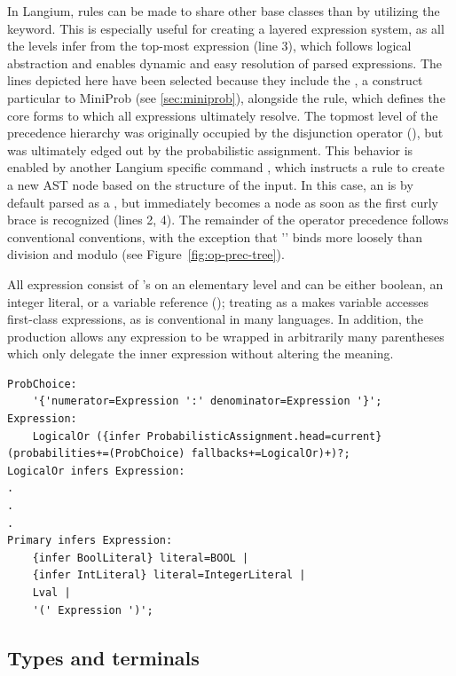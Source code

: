 In Langium, rules can be made to share other base classes than  by utilizing the  keyword. This is especially useful for creating a layered expression system, as all the levels infer from the top-most expression (line 3), which follows logical abstraction and enables dynamic and easy resolution of parsed expressions.
The lines depicted here have been selected because they include the , a construct particular to MiniProb (see \ref{sec:miniprob}), alongside the  rule, which defines the core forms to which all expressions ultimately resolve.
The topmost level of the precedence hierarchy was originally occupied by the disjunction operator (\code{||}), but was ultimately edged out by the probabilistic assignment. This behavior is enabled by another Langium specific command , which instructs a rule to create a new AST node based on the structure of the input.
In this case, an  is by default parsed as a , but immediately becomes a  node as soon as the first curly brace is recognized (lines 2, 4). The remainder of the operator precedence follows conventional conventions, with the exception that '\code{*}' binds more loosely than division and modulo (see Figure~\ref{fig:op-prec-tree}).

All expression consist of 's on an elementary level and can be either boolean, an integer literal, or a variable reference (); treating  as a  makes variable accesses first-class expressions,
as is conventional in many languages. In addition, the production allows any expression to be wrapped in arbitrarily many parentheses which only delegate the inner expression without altering the meaning.

\begin{verbatim}
ProbChoice:
    '{'numerator=Expression ':' denominator=Expression '}';
Expression:
    LogicalOr ({infer ProbabilisticAssignment.head=current} (probabilities+=(ProbChoice) fallbacks+=LogicalOr)+)?;
LogicalOr infers Expression:
.
.
.
Primary infers Expression:
    {infer BoolLiteral} literal=BOOL | 
    {infer IntLiteral} literal=IntegerLiteral |
    Lval |
    '(' Expression ')';
\end{verbatim}
\vspace{0.5em}

\subsection*{Types and terminals}

